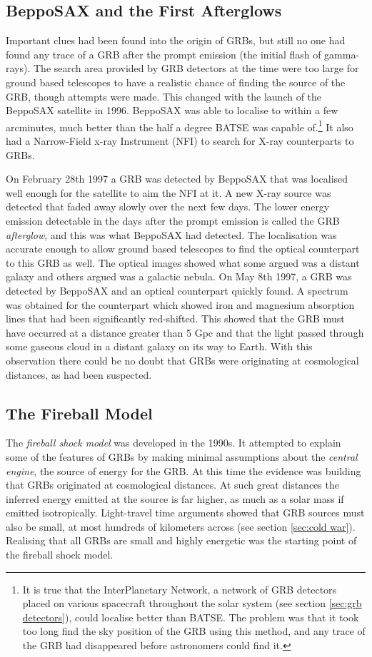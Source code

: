 \documentclass[11pt]{cuthesis}
\begin{document}
\subsection{BeppoSAX and the First Afterglows}
Important clues had been found into the origin of GRBs, but still no one had found any trace of a GRB after the prompt emission (the initial flash of gamma-rays). The search area provided by GRB detectors at the time were too large for ground based telescopes to have a realistic chance of finding the source of the GRB, though attempts were made. This changed with the launch of the BeppoSAX satellite in 1996. BeppoSAX was able to localise to within a few arcminutes, much better than the half a degree BATSE was capable of.\footnote{It is true that the InterPlanetary Network, a network of GRB detectors placed on various spacecraft throughout the solar system (see section \ref{sec:grb detectors}), could localise better than BATSE. The problem was that it took too long find the sky position of the GRB using this method, and any trace of the GRB had disappeared before astronomers could find it.} It also had a Narrow-Field x-ray Instrument (NFI) to search for X-ray counterparts to GRBs.

On February 28th 1997 a GRB was detected by BeppoSAX that was localised well enough for the satellite to aim the NFI at it. A new X-ray source was detected that faded away slowly over the next few days. The lower energy emission detectable in the days after the prompt emission is called the GRB \textit{afterglow}, and this was what BeppoSAX had detected. The localisation was accurate enough to allow ground based telescopes to find the optical counterpart to this GRB as well. The optical images showed what some argued was a distant galaxy and others argued was a galactic nebula. On May 8th 1997, a GRB was detected by BeppoSAX and an optical counterpart quickly found. A spectrum was obtained for the counterpart which showed iron and magnesium absorption lines that had been significantly red-shifted. This showed that the GRB must have occurred at a distance greater than 5 Gpc and that the light passed through some gaseous cloud in a distant galaxy on its way to Earth. With this observation there could be no doubt that GRBs were originating at cosmological distances, as had been suspected.  

\subsection{The Fireball Model} \label{sec: fireball}
The \textit{fireball shock model} was developed in the 1990s. It attempted to explain some of the features of GRBs by making minimal assumptions about the \textit{central engine}, the source of energy for the GRB. At this time the evidence was building that GRBs originated at cosmological distances. At such great distances the inferred energy emitted at the source is far higher, as much as a solar mass if emitted isotropically. Light-travel time arguments showed that GRB sources must also be small, at most hundreds of kilometers across (see section \ref{sec:cold war}). Realising that all GRBs are small and highly energetic was the starting point of the fireball shock model.
\end{document}
